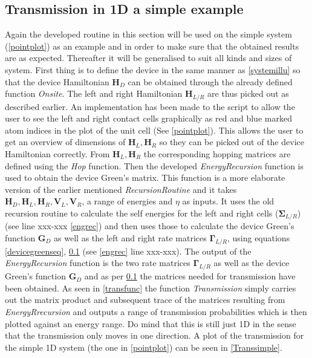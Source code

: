 \subsection{Transmission in 1D a simple example}
Again the developed routine in this section will be used on the simple system (\cref{pointplot}) as an example and in order to make sure that the obtained results are as expected. Thereafter it will be generalised to suit all kinds and sizes of system. First thing is to define the device in the same manner as \cref{systemillu} so that the device Hamiltonian \(\textbf{H}_D\) can be obtained through the already defined function \textit{Onsite}. The left and right Hamiltonian \(\textbf{H}_{L/R}\) are thus picked out as described earlier. An implementation has been made to the script to allow the user to see the left and right contact cells graphically as red and blue marked atom indices in the plot of the unit cell (See \cref{pointplot}).
This allows the user to get an overview of dimensions of \(\mathbf{H}_L,\mathbf{H}_R\) so they can be picked out of the device Hamiltonian correctly. From \(\mathbf{H}_L,\mathbf{H}_R\) the corresponding hopping matrices are defined using the \textit{Hop} function. Then the developed \textit{EnergyRecursion} function is used to obtain the device Green's matrix. This function is a more elaborate version of the earlier mentioned \textit{RecursionRoutine} and it takes \(\mathbf{H}_D,\mathbf{H}_L,\mathbf{H}_R,\mathbf{V}_L,\mathbf{V}_R\), a range of energies and \(\eta\) as inputs. It uses the old recursion routine to calculate the self energies for the left and right cells (\(\mathbf{\Sigma}_{L/R}\)) (see line xxx-xxx \cref{engrec}) and then uses those to calculate the device Green's function \(\textbf{G}_D\) as well as the left and right rate matrices \(\mathbf{\Gamma}_{L/R}\), using equations \cref{devicegreenseq}, \cref{} (see \cref{engrec} line xxx-xxx).
\vspace{-1\baselineskip}
\vspace{\baselineskip}The output of the \textit{EnergyRecursion} function is the two rate matrices \(\mathbf{\Gamma}_{L/R}\) as well as the device Green's function \(\mathbf{G}_D\) and as per \cref{} the matrices needed for transmission have been obtained. As seen in \cref{transfunc} the function \textit{Transmission} simply carries out the matrix product and subsequent trace of the matrices resulting from \textit{EnergyRrecursion} and outputs a range of transmission probabilities which is then plotted against an energy range. Do mind that this is still just 1D in the sense that the transmission only moves in one direction. A plot of the transmission for the simple 1D system (the one in \cref{pointplot}) can be seen in \cref{Transsimple}.
